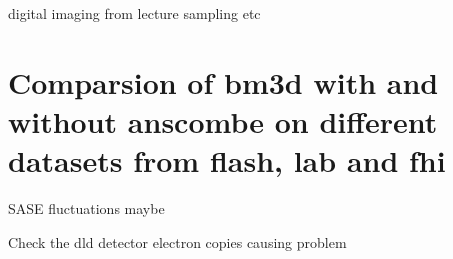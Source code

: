 digital imaging from lecture
sampling etc

\section{Comparsion of bm3d with and without anscombe on different datasets from flash, lab and fhi}

SASE fluctuations maybe

Check the dld detector electron copies causing problem

